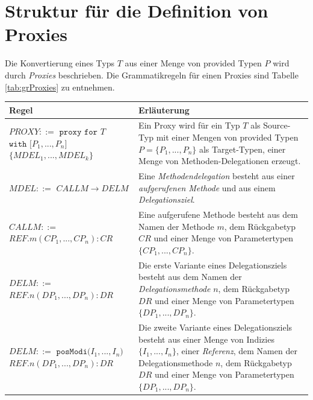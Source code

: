 \documentclass[a4paper,12pt]{article}
\begin{document}
\section{Struktur für die Definition von Proxies}\label{sec:proxygram}
Die Konvertierung eines Typs $T$ aus einer Menge von provided Typen $P$ wird durch \emph{Proxies} beschrieben. Die Grammatikregeln für einen Proxies sind Tabelle \ref{tab:grProxies} zu entnehmen.
\begin{table}[H]
\centering
\begin{tabular}{|p{5cm}|p{9cm}|}
\hline
\hline
\centering\textbf{Regel} & \textbf{Erläuterung} \\
\hline
\hline
$\mathit{PROXY} ::=$\newline
$\texttt{proxy } \texttt{for } T$\newline
$ \texttt{with [}\mathit{P_1},...,\mathit{P_n}\texttt{]}$ \newline
$\texttt{\{}\mathit{MDEL_1},...,\mathit{MDEL_k} \texttt{\}}$
 & Ein Proxy wird für ein Typ $T$ als Source-Typ mit einer Mengen von provided Typen $P = \{P_1,...,P_n\}$ als Target-Typen, einer Menge von Methoden-Delegationen erzeugt.\\
\hline
$\mathit{MDEL} ::=$\newline
$CALLM \rightarrow DELM $  & Eine \emph{Methodendelegation} besteht aus einer \emph{aufgerufenen Methode} und aus einem \emph{Delegationsziel}.\\
\hline
$\mathit{CALLM} ::=$\newline 
$\mathit{REF}.\mathit{m(\mathit{CP_1},...,\mathit{CP_n}):CR} $  & Eine aufgerufene Methode besteht aus dem Namen der Methode $m$, dem Rückgabetyp $\mathit{CR}$ und einer Menge von Parametertypen $\{\mathit{CP_1},...,\mathit{CP_n}\}$.\\
\hline
$\mathit{DELM} ::=$\newline 
$\mathit{REF}.\mathit{n(\mathit{DP_1},...,\mathit{DP_n}):DR} $  
& Die erste Variante eines Delegationsziels besteht aus  dem Namen der \emph{Delegationsmethode} $n$, dem Rückgabetyp $\mathit{DR}$ und einer Menge von Parametertypen $\{\mathit{DP_1},...,\mathit{DP_n}\}$.\\
\hline
$\mathit{DELM} ::=$\newline
$\texttt{posModi(} \mathit{I_1},...,\mathit{I_n} \texttt{)}$\newline
$\mathit{REF}.\mathit{n(\mathit{DP_1},...,\mathit{DP_n}):DR} $  
& Die zweite Variante eines Delegationsziels besteht aus einer Menge von Indizies $\{\mathit{I_1},...,\mathit{I_n}\}$, einer \emph{Referenz}, dem Namen der Delegationsmethode $n$, dem Rückgabetyp $\mathit{DR}$ und einer Menge von Parametertypen $\{\mathit{DP_1},...,\mathit{DP_n}\}$.\\

\end{tabular}
\end{table}
\end{document}

